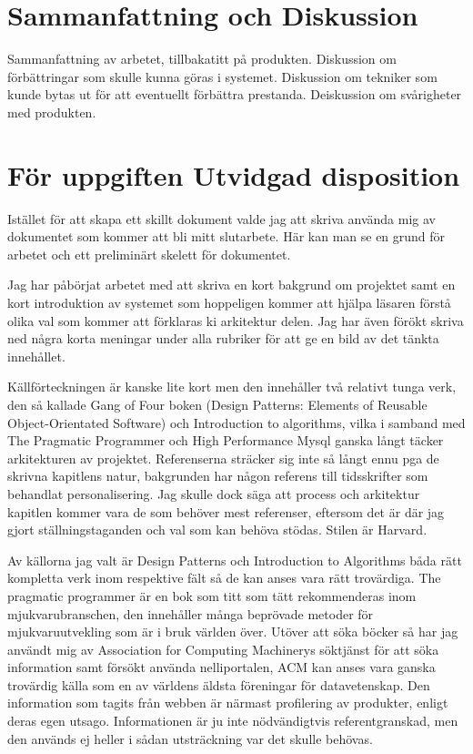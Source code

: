 \section{Sammanfattning och Diskussion}

Sammanfattning av arbetet, tillbakatitt på produkten. Diskussion om förbättringar som skulle kunna göras i systemet. Diskussion om tekniker som kunde bytas ut för att eventuellt förbättra prestanda. Deiskussion om svårigheter med produkten.

\section{För uppgiften Utvidgad disposition}

Istället för att skapa ett skillt dokument valde jag att skriva använda mig av dokumentet som kommer att bli mitt slutarbete. Här kan man se en grund för arbetet och ett preliminärt skelett för dokumentet.

Jag har påbörjat arbetet med att skriva en kort bakgrund om projektet samt en kort introduktion av systemet som hoppeligen kommer att hjälpa läsaren förstå olika val som kommer att förklaras ki arkitektur delen. Jag har även förökt skriva ned några korta meningar under alla rubriker för att ge en bild av det tänkta innehållet.

Källförteckningen är kanske lite kort men den innehåller två relativt tunga verk, den så kallade Gang of Four boken (Design Patterns: Elements of Reusable Object-Orientated Software) och Introduction to algorithms, vilka i samband med The Pragmatic Programmer och High Performance Mysql ganska långt täcker arkitekturen av projektet. Referenserna sträcker sig inte så långt ennu pga de skrivna kapitlens natur, bakgrunden har någon referens till tidsskrifter som behandlat personalisering. Jag skulle dock säga att process och arkitektur kapitlen kommer vara de som behöver mest referenser, eftersom det är där jag gjort ställningstaganden och val som kan behöva stödas. Stilen är Harvard.

Av källorna jag valt är Design Patterns och Introduction to Algorithms båda rätt kompletta verk inom respektive fält så de kan anses vara rätt trovärdiga. The pragmatic programmer är en bok som titt som tätt rekommenderas inom mjukvarubranschen, den innehåller många beprövade metoder för mjukvaruutvekling som är i bruk världen över. Utöver att söka böcker så har jag användt mig av Association for Computing Machinerys söktjänst för att söka information samt försökt använda nelliportalen, ACM kan anses vara ganska trovärdig källa som en av världens äldsta föreningar för datavetenskap. Den information som tagits från webben är närmast profilering av produkter, enligt deras egen utsago. Informationen är ju inte nödvändigtvis referentgranskad, men den används ej heller i sådan utsträckning var det skulle behövas.


